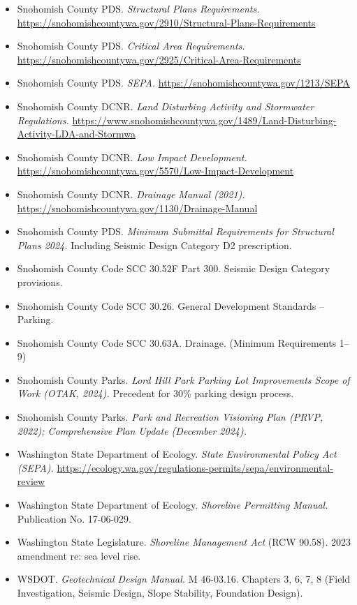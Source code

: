 \documentclass[11pt,letterpaper]{article}
\begin{document}
\begin{itemize}
  \item Snohomish County PDS. \textit{Structural Plans Requirements.} \url{https://snohomishcountywa.gov/2910/Structural-Plans-Requirements}
  \item Snohomish County PDS. \textit{Critical Area Requirements.} \url{https://snohomishcountywa.gov/2925/Critical-Area-Requirements}
  \item Snohomish County PDS. \textit{SEPA.} \url{https://snohomishcountywa.gov/1213/SEPA}
  \item Snohomish County DCNR. \textit{Land Disturbing Activity and Stormwater Regulations.} \url{https://www.snohomishcountywa.gov/1489/Land-Disturbing-Activity-LDA-and-Stormwa}
  \item Snohomish County DCNR. \textit{Low Impact Development.} \url{https://snohomishcountywa.gov/5570/Low-Impact-Development}
  \item Snohomish County DCNR. \textit{Drainage Manual (2021).} \url{https://snohomishcountywa.gov/1130/Drainage-Manual}
  \item Snohomish County PDS. \textit{Minimum Submittal Requirements for Structural Plans 2024.} Including Seismic Design Category D2 prescription.
  \item Snohomish County Code SCC 30.52F Part 300. Seismic Design Category provisions.
  \item Snohomish County Code SCC 30.26. General Development Standards -- Parking.
  \item Snohomish County Code SCC 30.63A. Drainage. (Minimum Requirements 1--9)
  \item Snohomish County Parks. \textit{Lord Hill Park Parking Lot Improvements Scope of Work (OTAK, 2024).} Precedent for 30\% parking design process.
  \item Snohomish County Parks. \textit{Park and Recreation Visioning Plan (PRVP, 2022); Comprehensive Plan Update (December 2024).}
  \item Washington State Department of Ecology. \textit{State Environmental Policy Act (SEPA).} \url{https://ecology.wa.gov/regulations-permits/sepa/environmental-review}
  \item Washington State Department of Ecology. \textit{Shoreline Permitting Manual.} Publication No. 17-06-029.
  \item Washington State Legislature. \textit{Shoreline Management Act} (RCW 90.58). 2023 amendment re: sea level rise.
  \item WSDOT. \textit{Geotechnical Design Manual.} M 46-03.16. Chapters 3, 6, 7, 8 (Field Investigation, Seismic Design, Slope Stability, Foundation Design).

\end{itemize}
\end{document}
